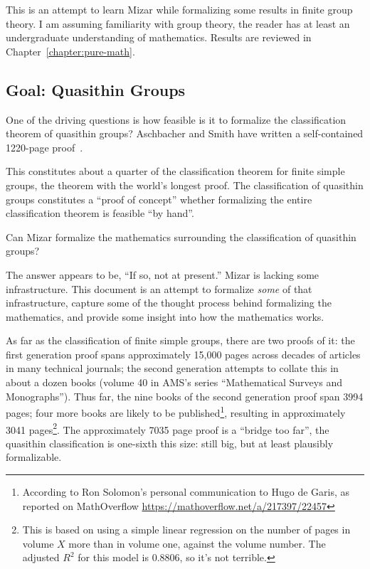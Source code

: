\preface

This is an attempt to learn Mizar while formalizing some results in
finite group theory. I am assuming familiarity with group theory, the
reader has at least an undergraduate understanding of mathematics.
Results are reviewed in Chapter~\ref{chapter:pure-math}.

\subsection*{Goal: Quasithin Groups}
One of the driving questions is how feasible is it to formalize the
classification theorem of quasithin groups? Aschbacher and Smith have
written a self-contained 1220-page
proof~\cite{aschbacher2004classification1,aschbacher2004classification2}.

This constitutes about a quarter of the classification theorem for
finite simple groups, the theorem with the world's longest proof. The
classification of quasithin groups constitutes a ``proof of concept''
whether formalizing the entire classification theorem is feasible ``by hand''.

\bigbreak
Can Mizar formalize the mathematics surrounding the classification of
quasithin groups?

The answer appears to be, ``If so, not at present.'' Mizar is lacking
some infrastructure. This document is an attempt to formalize
\emph{some} of that infrastructure, capture some of the thought process
behind formalizing the mathematics, and provide some insight into how
the mathematics works.

\bigbreak
As far as the classification of finite simple groups, there are two
proofs of it: the first generation proof spans approximately {15,000}
pages across decades of articles in many technical journals; the second
generation attempts to collate this in about a dozen books (volume 40 in
AMS's series ``Mathematical Surveys and Monographs''). Thus far, the
nine books of the second generation proof span 3994 pages; four more
books are likely to be published\footnote{According to Ron Solomon's
personal communication to Hugo de Garis, as reported on MathOverflow \url{https://mathoverflow.net/a/217397/22457}}, resulting in approximately 3041
pages\footnote{This is based on using a simple linear regression on the
number of pages in volume $X$ more than in volume one, against the
volume number. The adjusted $R^{2}$ for this model is $0.8806$, so it's
not terrible.}. The approximately 7035 page proof is a ``bridge too
far'', the quasithin classification is one-sixth this size: still big,
but at least plausibly formalizable.

